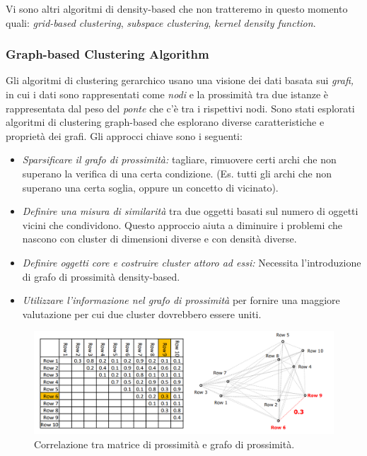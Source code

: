 Vi sono altri algoritmi di density-based che non tratteremo in questo momento quali: \textit{grid-based clustering}, \textit{subspace clustering}, \textit{kernel density function}.

\subsubsection{Graph-based Clustering Algorithm}
Gli algoritmi di clustering gerarchico usano una visione dei dati basata sui \textit{grafi,} in cui i dati sono rappresentati come \textit{nodi} e la prossimità tra due istanze è rappresentata dal peso del \textit{ponte} che c'è tra i rispettivi nodi. Sono stati esplorati algoritmi di clustering graph-based che esplorano diverse caratteristiche e proprietà dei grafi. Gli approcci chiave sono i seguenti:
\begin{itemize}
	\item \textit{Sparsificare il grafo di prossimità:} tagliare, rimuovere certi archi che non superano la verifica di una certa condizione. (Es. tutti gli archi che non superano una certa soglia, oppure un concetto di vicinato). 
	\item\textit{Definire una misura di similarità} tra due oggetti basati sul numero di oggetti vicini che condividono. Questo approccio aiuta a diminuire i problemi che nascono con cluster di dimensioni diverse e con densità diverse. 
	\item \textit{Definire oggetti core e costruire cluster attoro ad essi:} Necessita l'introduzione di grafo di prossimità density-based.
	\item \textit{Utilizzare l'informazione nel grafo di prossimità} per fornire una maggiore valutazione per cui due cluster dovrebbero essere uniti. 
\end{itemize}

\begin{figure}[H]
	\centering
	\includegraphics[height=0.30 \linewidth]{clustering/pict/proximity_graph.png}
	\caption{Correlazione tra matrice di prossimità e grafo di prossimità.}
\end{figure}

